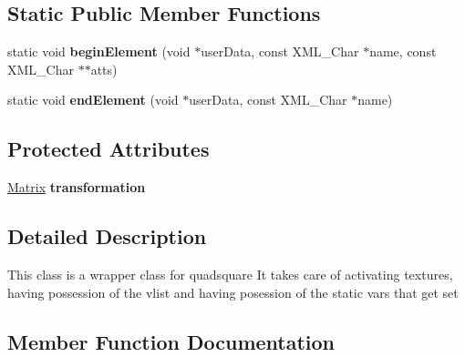 \subsection*{Static Public Member Functions}
\begin{DoxyCompactItemize}
\item 
static void {\bfseries begin\+Element} (void $\ast$user\+Data, const X\+M\+L\+\_\+\+Char $\ast$name, const X\+M\+L\+\_\+\+Char $\ast$$\ast$atts)\hypertarget{classQuadTree_afc3bad3adf873d0efa1b0afb6e3e9821}{}\label{classQuadTree_afc3bad3adf873d0efa1b0afb6e3e9821}

\item 
static void {\bfseries end\+Element} (void $\ast$user\+Data, const X\+M\+L\+\_\+\+Char $\ast$name)\hypertarget{classQuadTree_a3433a67cc6a78391560b01ef0640ba5d}{}\label{classQuadTree_a3433a67cc6a78391560b01ef0640ba5d}

\end{DoxyCompactItemize}
\subsection*{Protected Attributes}
\begin{DoxyCompactItemize}
\item 
\hyperlink{classMatrix}{Matrix} {\bfseries transformation}\hypertarget{classQuadTree_a394b600aad893147bd35fe3168762a54}{}\label{classQuadTree_a394b600aad893147bd35fe3168762a54}

\end{DoxyCompactItemize}


\subsection{Detailed Description}
This class is a wrapper class for quadsquare It takes care of activating textures, having possession of the vlist and having posession of the static vars that get set 

\subsection{Member Function Documentation}
